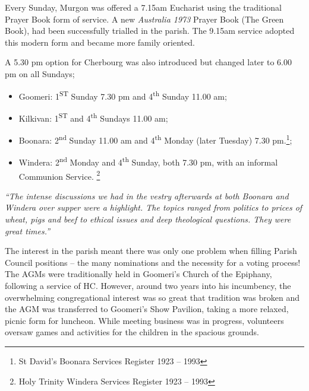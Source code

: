 Every Sunday, Murgon was offered a 7.15am Eucharist using the traditional Prayer Book form of service. A new \emph{Australia 1973} Prayer Book (The Green Book), had been successfully trialled in the parish. The 9.15am service adopted this modern form and became more family oriented.



A 5.30 pm option for Cherbourg was also introduced but changed later to 6.00 pm on all Sundays;



\begin{itemize}

\item

  Goomeri: 1\textsuperscript{ST} Sunday 7.30 pm and 4\textsuperscript{th} Sunday 11.00 am;

\item

  Kilkivan: 1\textsuperscript{ST} and 4\textsuperscript{th} Sundays 11.00 am;

\end{itemize}



\begin{itemize}

\item

  Boonara: 2\textsuperscript{nd} Sunday 11.00 am and 4\textsuperscript{th} Monday (later Tuesday) 7.30 pm.\footnote{St David's Boonara Services Register 1923 -- 1993};
\item

  Windera: 2\textsuperscript{nd} Monday and 4\textsuperscript{th} Sunday, both 7.30 pm, with an informal Communion Service. \footnote{Holy Trinity Windera Services Register 1923 -- 1993}
\end{itemize}



\emph{``The intense discussions we had in the vestry afterwards at both Boonara and Windera over supper were a highlight. The topics ranged from politics to prices of wheat, pigs and beef to ethical issues and deep theological questions. They were great times.''}



The interest in the parish meant there was only one problem when filling Parish Council positions -- the many nominations and the necessity for a voting process! The AGMs were traditionally held in Goomeri's Church of the Epiphany, following a service of HC. However, around two years into his incumbency, the overwhelming congregational interest was so great that tradition was broken and the AGM was transferred to Goomeri's Show Pavilion, taking a more relaxed, picnic form for luncheon. While meeting business was in progress, volunteers oversaw games and activities for the children in the spacious grounds.



